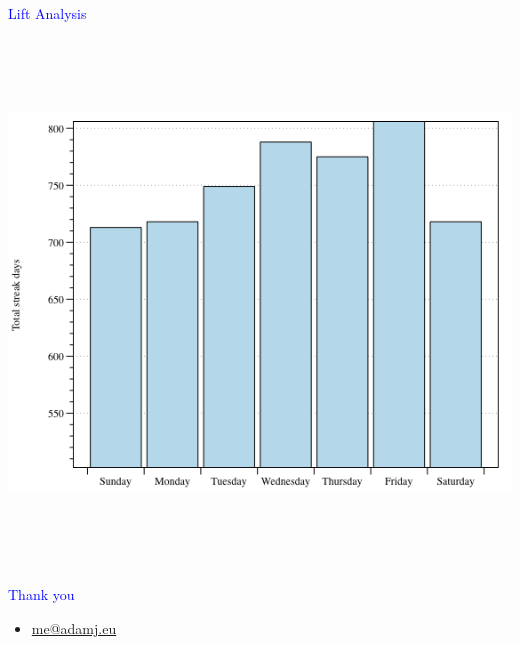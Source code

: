 \documentclass[landscape]{slides}
\begin{document}
\begin{slide}

    \textcolor{blue}{\Large{Lift Analysis}}

    \begin{center}
        \includegraphics[height=14cm]{lift-group-day}
    \end{center}

\end{slide}


\begin{slide}
    \textcolor{blue}{\Large{Thank you}}

    \begin{itemize}
        \item \url{me@adamj.eu}
    \end{itemize}

\end{slide}
\end{document}
